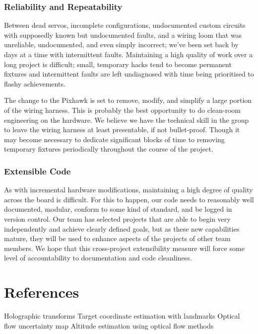 \documentclass[a4paper, 11pt, titlepage]{article}
\begin{document}
    \subsubsection{Reliability and Repeatability}
    \label{sec:Reliability}
      Between dead servos, incomplete configurations, undocumented custom circuits with supposedly known but undocumented faults, and a wiring loom that was unreliable, undocumented, and even simply incorrect;  we've been set back by days at a time with intermittent faults.
      Maintaining a high quality of work over a long project is difficult; small, temporary hacks tend to become permanent fixtures and intermittent faults are left undiagnosed with time being prioritised to flashy achievements.

      The change to the Pixhawk is set to remove, modify, and simplify a large portion of the wiring harness.  This is probably the best opportunity to do clean-room engineering on the hardware.  We believe we have the technical skill in the group to leave the wiring harness at least presentable, if not bullet-proof.
      Though it may become necessary to dedicate significant blocks of time to removing temporary fixtures periodically throughout the course of the project.

    \subsubsection{Extensible Code}
      As with incremental hardware modifications, maintaining a high degree of quality across the board is difficult.  
      For this to happen, our code needs to reasonably well documented, modular, conform to some kind of standard, and be logged in version control. 
      Our team has selected projects that are able to begin very independently and achieve clearly defined goals, but as these new capabilities mature, they will be used to enhance aspects of the projects of other team members.  We hope that this cross-project extensibility measure will force some level of accountability to documentation and code cleanliness.



  \section{References}
    Holographic transforms
    Target coordinate estimation with landmarks
    Optical flow uncertainty map
    Altitude estimation using optical flow methods

\renewcommand{\refname}{References}


%







	
\end{document}

